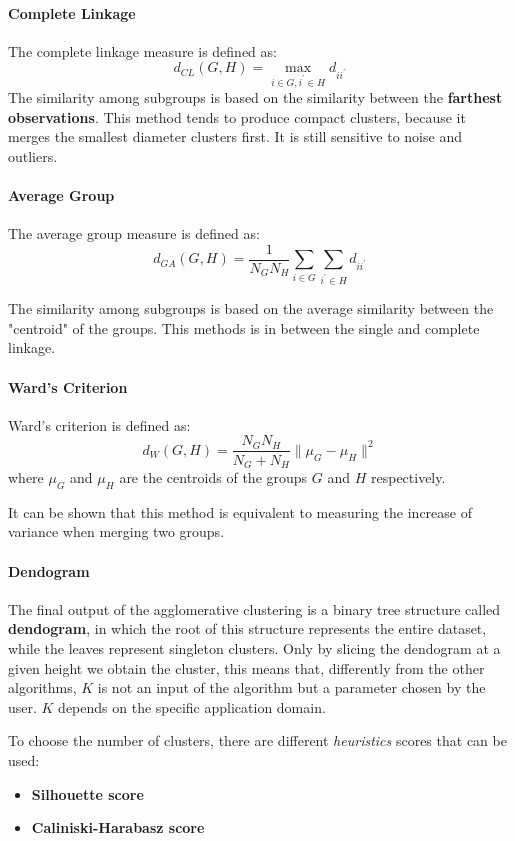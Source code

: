\paragraph*{Complete Linkage}
The complete linkage measure is defined as:
\[
    d_{CL}(G,H) = \max_{i \in G, i^{\prime} \in H} d_{ii^{\prime}}
\]
The similarity among subgroups is based on the similarity between the \textbf{farthest observations}. This method tends to produce compact clusters, because it merges the smallest diameter clusters first. It is still sensitive to noise and outliers.

\paragraph*{Average Group}
The average group measure is defined as:
\[
    d_{GA}(G,H) = \frac{1}{N_G N_H} \sum_{i \in G} \sum_{i^{\prime} \in H} d_{ii^{\prime}}
\]

The similarity among subgroups is based on the average similarity between the "centroid" of the groups. This methods is in between the single and complete linkage.

\paragraph*{Ward's Criterion}
Ward's criterion is defined as:
\[
    d_W(G,H) = \frac{N_G N_H}{N_G + N_H} \| \mu_G - \mu_H \|^2
\]
where $\mu_G$ and $\mu_H$ are the centroids of the groups $G$ and $H$ respectively.

It can be shown that this method is equivalent to measuring the increase of variance when merging two groups.

\paragraph*{Dendogram}
The final output of the agglomerative clustering is a binary tree structure called \textbf{dendogram}, in which the root of this structure represents the entire dataset, while the leaves represent singleton clusters. Only by slicing the dendogram at a given height we obtain the cluster, this means that, differently from the other algorithms, $K$ is not an input of the algorithm but a parameter chosen by the user. $K$ depends on the specific application domain.

To choose the number of clusters, there are different \textit{heuristics} scores that can be used:
\begin{itemize}
    \item \textbf{Silhouette score}
    \item \textbf{Caliniski-Harabasz score}
\end{itemize}

